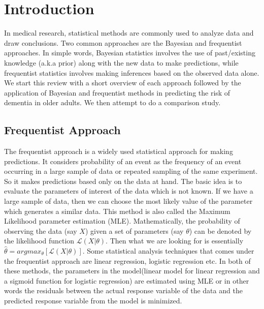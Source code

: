 \documentclass[12pt,letterpaper]{article}
\begin{document}
\par
\thispagestyle{firstpage}
\section{Introduction}
In medical research, statistical methods are commonly used to analyze data and draw conclusions. Two common approaches are the Bayesian and frequentist approaches. In simple words, Bayesian statistics involves the use of past/existing knowledge (a.k.a prior) along with the new data to make predictions, while frequentist statistics involves making inferences based on the observed data alone. We start this review with a short overview of each approach followed by the application of Bayesian and frequentist methods in predicting the risk of dementia in older adults. We then attempt to do a comparison study.


\subsection{Frequentist Approach}

The frequentist approach \cite{chen2018,mary} is a widely used statistical approach for making predictions. It considers probability of an event as the frequency of an event occurring in a large sample of data or repeated sampling of the same experiment. So it makes predictions based only on the data at hand. The basic idea is to evaluate the parameters of interest of the data which is not known. If we have a large sample of data, then we can choose the most likely value of the parameter which generates a similar data. This method is also called the Maximum Likelihood parameter estimation (MLE). Mathematically, the probability of observing the data (say $X$) given a set of parameters (say $\theta$) can be denoted by the likelihood function $\mathcal{L}(X|\theta)$. Then what we are looking for is essentially $\hat{\theta}=argmax_\theta [\mathcal{L}(X|\theta)]$. Some statistical analysis techniques that comes under the frequentist approach are linear regression, logistic regression etc. In both of these methods, the parameters in the model(linear model for linear regression and a sigmoid function for logistic regression) are estimated using MLE or in other words the residuals between the actual response variable of the data and the predicted response variable from the model is minimized. 
\end{document}
